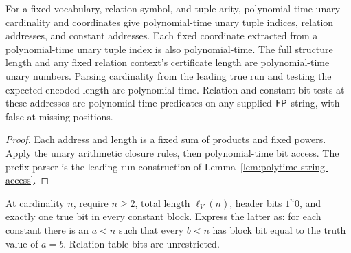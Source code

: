 \begin{theorem}
  \label{thm:desc-encoding-access-polytime}
  \leanok
  For a fixed vocabulary, relation symbol, and tuple arity, polynomial-time
  unary cardinality and coordinates give polynomial-time unary tuple indices,
  relation addresses, and constant addresses. Each fixed coordinate extracted
  from a polynomial-time unary tuple index is also polynomial-time. The full structure length and
  any fixed relation context's certificate length are polynomial-time unary
  numbers. Parsing cardinality from the leading true run and testing the
  expected encoded length are polynomial-time. Relation and constant bit
  tests at these addresses are polynomial-time predicates on any supplied
  $\mathsf{FP}$ string, with false at missing positions.
\end{theorem}
\begin{proof}
  \leanok
  Each address and length is a fixed sum of products and fixed powers.
  Apply the unary arithmetic closure rules, then polynomial-time bit access.
  The prefix parser is the leading-run construction of
  Lemma~\ref{lem:polytime-string-access}.
\end{proof}

\begin{definition}
  \label{def:desc-valid-encoding}
  \leanok
  At cardinality $n$, require $n\ge2$, total length $\ell_V(n)$, header bits
  $1^n0$, and exactly one true bit in every constant block. Express the latter
  as: for each constant there is an $a<n$ such that every $b<n$ has block bit
  equal to the truth value of $a=b$. Relation-table bits are unrestricted.
\end{definition}

